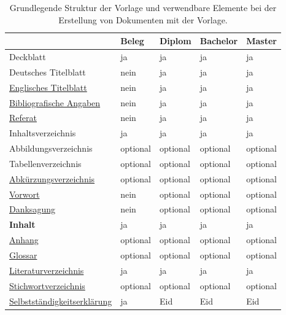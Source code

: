 \documentclass[
%
	thesis=paper,		%
	compactlistof,		%
	noauthorship,		%
%
	fancy,				%
%
%
]{hsmw-thesis}
\begin{document}
	\begin{table}[!htb]
		\centering
		\caption{Grundlegende Struktur der Vorlage und verwendbare Elemente bei der Erstellung von Dokumenten mit der Vorlage.}
		\label{tab:documentStructure}
		\begin{tabular}{lllll}
			\toprule
			& \textbf{Beleg} & \textbf{Diplom} & \textbf{Bachelor} & \textbf{Master} \\
			\midrule
			Deckblatt & ja & ja & ja & ja \\
			Deutsches Titelblatt & nein & ja & ja & ja \\
			\hyperref[itm:englishTitle]{Englisches Titelblatt} & nein & ja & ja & ja \\
			\hyperref[itm:bibliographicData]{Bibliografische Angaben} & nein & ja & ja & ja \\
			\hyperref[itm:abstract]{Referat} & nein & ja & ja & ja \\
			\cmidrule(r){1-1}
			\cmidrule(l){2-5}
			Inhaltsverzeichnis & ja & ja & ja & ja \\
			Abbildungsverzeichnis & optional & optional & optional & optional \\
			Tabellenverzeichnis & optional & optional & optional & optional \\
			\hyperref[itm:acronyms]{Abkürzungsverzeichnis} & optional & optional & optional & optional \\
			\cmidrule(r){1-1}
			\cmidrule(l){2-5}
			\hyperref[itm:preface]{Vorwort} & nein & optional & optional & optional \\
			\hyperref[itm:dedication]{Danksagung} & nein & optional & optional & optional \\
			\cmidrule(r){1-1}
			\cmidrule(l){2-5}
			\textbf{Inhalt} & ja & ja & ja & ja \\
			\hyperref[itm:appendix]{Anhang} & optional & optional & optional & optional \\
			\cmidrule(r){1-1}
			\cmidrule(l){2-5}
			\hyperref[itm:glossary]{Glossar} & optional & optional & optional & optional \\
			\hyperref[itm:bibliography]{Literaturverzeichnis} & ja & ja & ja & ja \\
			\hyperref[itm:index]{Stichwortverzeichnis} & optional & optional & optional & optional \\
			\hyperref[itm:soa]{Selbstständigkeitserklärung} & ja & Eid & Eid & Eid \\
			\bottomrule
		\end{tabular}
	\end{table}
	
\end{document}
